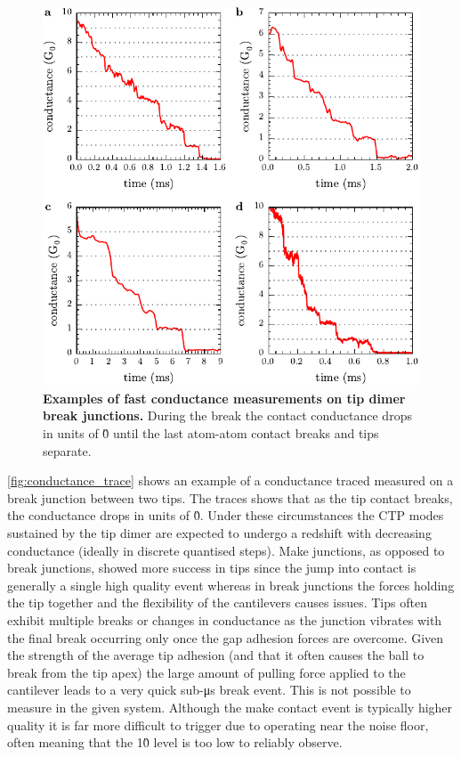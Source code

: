 \documentclass[12pt, a4paper, twoside]{book}
\begin{document}
\begin{figure}[bt]
\centering
\includegraphics{figures/conductance_traces}
\caption[Examples of fast conductance measurements on tip dimers]{\textbf{Examples of fast conductance measurements on tip dimer break junctions.} During the break the contact conductance drops in units of \G0 until the last atom-atom contact breaks and tips separate.}
\label{fig:conductance_trace}
\end{figure}

\autoref{fig:conductance_trace} shows an example of a conductance traced measured on a break junction between two tips. The traces shows that as the tip contact breaks, the conductance drops in units of \G0. Under these circumstances the CTP modes sustained by the tip dimer are expected to undergo a redshift with decreasing conductance (ideally in discrete quantised steps). Make junctions, as opposed to break junctions, showed more success in tips since the jump into contact is generally a single high quality event whereas in break junctions the forces holding the tip together and the flexibility of the cantilevers causes issues. Tips often exhibit multiple breaks or changes in conductance as the junction vibrates with the final break occurring only once the gap adhesion forces are overcome. Given the strength of the average tip adhesion (and that it often causes the ball to break from the tip apex) the large amount of pulling force applied to the cantilever leads to a very quick sub-\si{\micro\second} break event. This is not possible to measure in the given system. Although the make contact event is typically higher quality it is far more difficult to trigger due to operating near the noise floor, often meaning that the 1\G0 level is too low to reliably observe.
\end{document}
